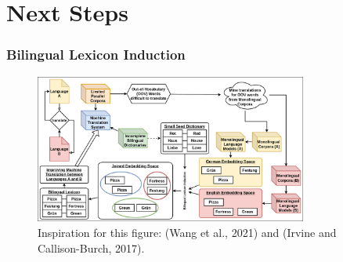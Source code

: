 \documentclass[aspectratio=169]{beamer}
\begin{document}
\section{Next Steps}


\begin{frame}[fragile]
	\frametitle{Bilingual Lexicon Induction}
    \begin{figure}
        \centering
        \includegraphics[width=0.8\textwidth]{images/ChameleonMT-BLI-BLI.png}
        \caption{Inspiration for this figure: (Wang et al., 2021) and (Irvine and Callison-Burch, 2017).}
    \end{figure}
\end{frame}
\end{document}
